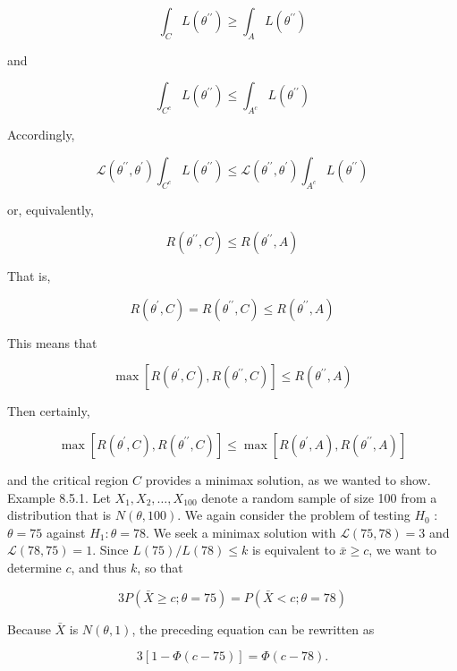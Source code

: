 $$
\int_{C} L\left(\theta^{\prime \prime}\right) \geq \int_{A} L\left(\theta^{\prime \prime}\right)
$$

and

$$
\int_{C^{c}} L\left(\theta^{\prime \prime}\right) \leq \int_{A^{c}} L\left(\theta^{\prime \prime}\right)
$$

Accordingly,

$$
\mathcal{L}\left(\theta^{\prime \prime}, \theta^{\prime}\right) \int_{C^{c}} L\left(\theta^{\prime \prime}\right) \leq \mathcal{L}\left(\theta^{\prime \prime}, \theta^{\prime}\right) \int_{A^{c}} L\left(\theta^{\prime \prime}\right)
$$

or, equivalently,

$$
R\left(\theta^{\prime \prime}, C\right) \leq R\left(\theta^{\prime \prime}, A\right)
$$

That is,

$$
R\left(\theta^{\prime}, C\right)=R\left(\theta^{\prime \prime}, C\right) \leq R\left(\theta^{\prime \prime}, A\right)
$$

This means that

$$
\max \left[R\left(\theta^{\prime}, C\right), R\left(\theta^{\prime \prime}, C\right)\right] \leq R\left(\theta^{\prime \prime}, A\right)
$$

Then certainly,

$$
\max \left[R\left(\theta^{\prime}, C\right), R\left(\theta^{\prime \prime}, C\right)\right] \leq \max \left[R\left(\theta^{\prime}, A\right), R\left(\theta^{\prime \prime}, A\right)\right]
$$

and the critical region $C$ provides a minimax solution, as we wanted to show.\\
Example 8.5.1. Let $X_{1}, X_{2}, \ldots, X_{100}$ denote a random sample of size 100 from a distribution that is $N(\theta, 100)$. We again consider the problem of testing $H_{0}$ : $\theta=75$ against $H_{1}: \theta=78$. We seek a minimax solution with $\mathcal{L}(75,78)=3$ and $\mathcal{L}(78,75)=1$. Since $L(75) / L(78) \leq k$ is equivalent to $\bar{x} \geq c$, we want to determine $c$, and thus $k$, so that


\begin{equation*}
3 P(\bar{X} \geq c ; \theta=75)=P(\bar{X}<c ; \theta=78) \tag{8.5.2}
\end{equation*}


Because $\bar{X}$ is $N(\theta, 1)$, the preceding equation can be rewritten as

$$
3[1-\Phi(c-75)]=\Phi(c-78) .
$$

